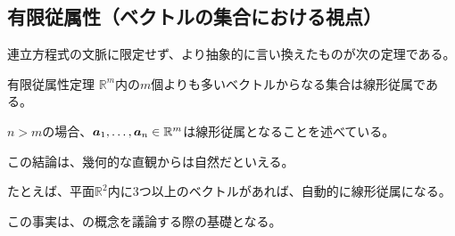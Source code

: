 \documentclass[../../../topic_linear-algebra]{subfiles}
\begin{document}
\subsection{有限従属性（ベクトルの集合における視点）}

連立方程式の文脈に限定せず、より抽象的に言い換えたものが次の定理である。

\begin{theorem}{有限従属性定理}\label{thm:finite-dependency}
  $\mathbb{R}^m$内の$m$個よりも多いベクトルからなる集合は線形従属である。
\end{theorem}

$n > m$の場合、$\vb*{a}_1, \dots, \vb*{a}_n \in \mathbb{R}^m$は線形従属となることを述べている。

\br

この結論は、幾何的な直観からは自然だといえる。

たとえば、平面$\mathbb{R}^2$内に3つ以上のベクトルがあれば、自動的に線形従属になる。

\br

この事実は、の概念を議論する際の基礎となる。
\end{document}
